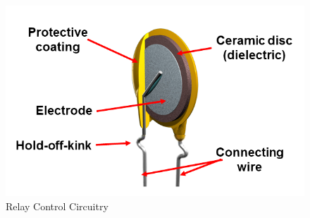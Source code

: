 \begin{figure}
\includegraphics[keepaspectratio=true,scale=.5]{./figures/testImage.png}
\centering
\caption{Relay Control Circuitry}
\label{cdlRelayCir_fig}
\end{figure}
